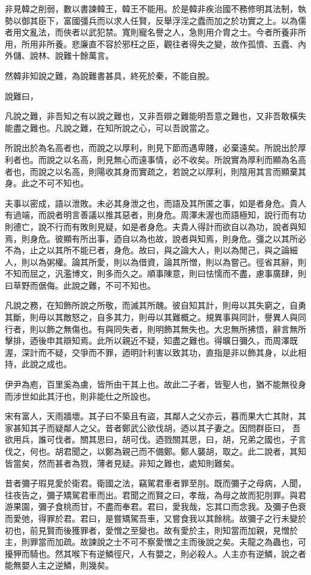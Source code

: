 非見韓之削弱，數以書諫韓王，韓王不能用。於是韓非疾治國不務修明其法制，執勢以御其臣下，富國彊兵而以求人任賢，反舉浮淫之蠹而加之於功實之上。以為儒者用文亂法，而俠者以武犯禁。寬則寵名譽之人，急則用介胄之士。今者所養非所用，所用非所養。悲廉直不容於邪枉之臣，觀往者得失之變，故作孤憤、五蠹、內外儲、說林、說難十餘萬言。

然韓非知說之難，為說難書甚具，終死於秦，不能自脫。

說難曰，

凡說之難，非吾知之有以說之難也，又非吾辯之難能明吾意之難也，又非吾敢橫失能盡之難也。凡說之難，在知所說之心，可以吾說當之。

所說出於為名高者也，而說之以厚利，則見下節而遇卑賤，必棄遠矣。所說出於厚利者也。而說之以名高，則見無心而遠事情，必不收矣。所說實為厚利而顯為名高者也，而說之以名高，則陽收其身而實疏之，若說之以厚利，則陰用其言而顯棄其身。此之不可不知也。

夫事以密成，語以泄敗。未必其身泄之也，而語及其所匿之事，如是者身危。貴人有過端，而說者明言善議以推其惡者，則身危。周澤未渥也而語極知，說行而有功則德亡，說不行而有敗則見疑，如是者身危。夫貴人得計而欲自以為功，說者與知焉，則身危。彼顯有所出事，迺自以為也故，說者與知焉，則身危。彊之以其所必不為，止之以其所不能已者，身危。故曰，與之論大人，則以為閒己，與之論細人，則以為粥權。論其所愛，則以為借資，論其所憎，則以為嘗己。徑省其辭，則不知而屈之，汎濫博文，則多而久之。順事陳意，則曰怯懦而不盡，慮事廣肆，則曰草野而倨侮。此說之難，不可不知也。

凡說之務，在知飾所說之所敬，而滅其所醜。彼自知其計，則毋以其失窮之，自勇其斷，則毋以其敵怒之，自多其力，則毋以其難概之。規異事與同計，譽異人與同行者，則以飾之無傷也。有與同失者，則明飾其無失也。大忠無所拂悟，辭言無所擊排，迺後申其辯知焉。此所以親近不疑，知盡之難也。得曠日彌久，而周澤既渥，深計而不疑，交爭而不罪，迺明計利害以致其功，直指是非以飾其身，以此相持，此說之成也。

伊尹為庖，百里奚為虜，皆所由干其上也。故此二子者，皆聖人也，猶不能無役身而涉世如此其汙也，則非能仕之所設也。

宋有富人，天雨牆壞。其子曰不築且有盜，其鄰人之父亦云，暮而果大亡其財，其家甚知其子而疑鄰人之父。昔者鄭武公欲伐胡，迺以其子妻之。因問群臣曰， 吾欲用兵，誰可伐者。關其思曰，胡可伐。迺戮關其思，曰，胡，兄弟之國也，子言伐之，何也。胡君聞之，以鄭為親己而不備鄭。鄭人襲胡，取之。此二說者，其知皆當矣，然而甚者為戮，薄者見疑。非知之難也，處知則難矣。

昔者彌子瑕見愛於衛君。衛國之法，竊駕君車者罪至刖。既而彌子之母病，人聞，往夜告之，彌子矯駕君車而出。君聞之而賢之曰，孝哉，為母之故而犯刖罪。與君游果園，彌子食桃而甘，不盡而奉君。君曰，愛我哉，忘其口而念我。及彌子色衰而愛弛，得罪於君。君曰，是嘗矯駕吾車，又嘗食我以其餘桃。故彌子之行未變於初也，前見賢而後獲罪者，愛憎之至變也。故有愛於主，則知當而加親，見憎於主，則罪當而加疏。故諫說之士不可不察愛憎之主而後說之矣。夫龍之為蟲也，可擾狎而騎也。然其喉下有逆鱗徑尺，人有嬰之，則必殺人。人主亦有逆鱗，說之者能無嬰人主之逆鱗，則幾矣。

